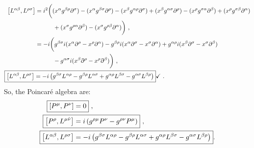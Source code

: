 \documentclass[12pt,a4paper]{report}
\begin{document}
    \begin{align}
    \left[L^{{\alpha}{\beta}},L^{{\rho}{\sigma}}\right]&=i^2\bigg((x^{{\alpha}}g^{{\beta}{\rho}}\partial^{{\sigma}})-(x^{{\alpha}}g^{{\beta}{\sigma}}\partial^{{\rho}})-(x^{{\beta}}g^{{\alpha}{\rho}}\partial^{{\sigma}})+(x^{{\beta}}g^{{\alpha}{\sigma}}\partial^{{\rho}})-(x^{{\rho}}g^{{\sigma}{\alpha}}\partial^{{\beta}})+(x^{{\rho}}g^{{\sigma}{\beta}}\partial^{{\alpha}})\nonumber\\
    &~~~~~~~~~+(x^{{\sigma}}g^{{\rho}{\alpha}}\partial^{{\beta}})-(x^{{\sigma}}g^{{\rho}{\beta}}\partial^{{\alpha}})\bigg)~,\nonumber\\
    &=-i\bigg(g^{{\beta}{\sigma}}i(x^{{\alpha}}\partial^{{\rho}}-x^{{\rho}}\partial^{{\alpha}})-g^{{\beta}{\rho}}i(x^{{\alpha}}\partial^{{\sigma}}-x^{{\sigma}}\partial^{{\alpha}})+g^{{\alpha}{\rho}}i(x^{{\beta}}\partial^{{\sigma}}-x^{{\sigma}}\partial^{{\beta}})\nonumber\\
    &~~~~~~~~~-g^{{\alpha}{\sigma}}i(x^{{\beta}}\partial^{{\rho}}-x^{{\rho}}\partial^{{\beta}})\bigg)~,\nonumber\\
    \Aboxed{\left[L^{{\alpha}{\beta}},L^{{\rho}{\sigma}}\right]&=-i\left(g^{{\beta}{\sigma}}L^{{\alpha}{\rho}}-g^{{\beta}{\rho}}L^{{\alpha}{\sigma}}+g^{{\alpha}{\rho}}L^{{\beta}{\sigma}}-g^{{\alpha}{\sigma}}L^{{\beta}{\rho}}\right)}\checkmark~.
\end{align}
So, the Poincaré algebra are: \cite{Itzykson, Antonin}
\begin{align}
 \Aboxed{\left[P^{{\mu}},P^{{\nu}}\right]&=0}~,\\
 \Aboxed{\left[P^{{\rho}},L^{{\mu}\hat{\nu}}\right]&=i\left(g^{{\rho}{\mu}}P^{{\nu}}-g^{{\rho}{\nu}}P^{{\mu}}\right)}~,\\
 \Aboxed{\left[L^{{\alpha}{\beta}},L^{{\rho}{\sigma}}\right]&=-i\left(g^{{\beta}{\sigma}}L^{{\alpha}{\rho}}-g^{{\beta}{\rho}}L^{{\alpha}{\sigma}}+g^{{\alpha}{\rho}}L^{{\beta}{\sigma}}-g^{{\alpha}{\sigma}}L^{{\beta}{\rho}}\right)}.
\end{align}
\end{document}
